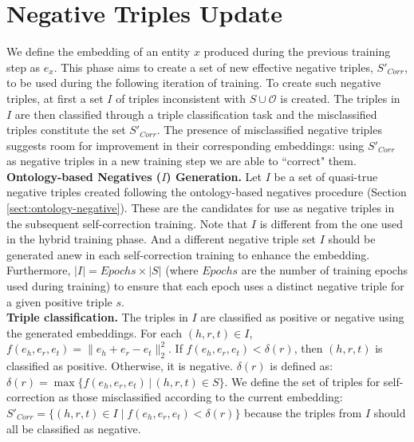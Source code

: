 \documentclass[sigconf]{acmart}
\begin{document}
\section{Negative Triples Update}
\label{sect:update}

We define the embedding of an entity $x$ produced during the previous training step as $e_x$. This phase aims to create  a set of new effective negative triples, $S'_{Corr}$, to be used during the following iteration of training.
To create such negative triples, at first a set $I$ of triples inconsistent with $S\cup \mathcal{O}$ is created. The triples in $I$ are then classified through a triple classification task and the misclassified triples constitute the set $S'_{Corr}$.
The presence of misclassified negative triples suggests room for improvement in their corresponding embeddings: using $S'_{Corr}$ as negative triples in a new training step we are able to ``correct" them. \\


\noindent \textbf{Ontology-based Negatives ($I$) Generation.} Let $I$ be a set of quasi-true negative triples created following the ontology-based negatives procedure (Section \ref{sect:ontology-negative}). These are the candidates for use as negative triples in the subsequent self-correction training. Note that $I$ is different from the one used in the hybrid training phase. And a different negative triple set $I$ should be generated anew in each self-correction training to enhance the embedding. Furthermore, $|I|=Epochs \times |S|$ (where $Epochs$ are the number of training epochs used during training) to ensure that each epoch uses a distinct negative triple for a given positive triple $s$. \\

\noindent \textbf{Triple classification.} The triples in $I$ are classified as positive or negative using the generated embeddings. For each $(h,r,t)\in I$, \(f(e_h,e_r,e_t) = \lVert e_h + e_r - e_t \rVert_2^2\). If $f(e_h,e_r,e_t)<\delta(r)$, then $ (h,r,t)$ is classified as positive. Otherwise, it is  negative. $\delta(r)$ is defined as:\(\delta(r) = \max \{ f(e_h,e_r,e_t) \, | \, (h,r,t) \in S  \}.\)  %
We define the set of  triples for self-correction as those misclassified according to the current embedding: \(S'_{Corr}=\{(h,r,t)\in I\mid f(e_h,e_r,e_t)<\delta(r)\}\) because the triples from $ I$ should all be classified as negative.
\end{document}

